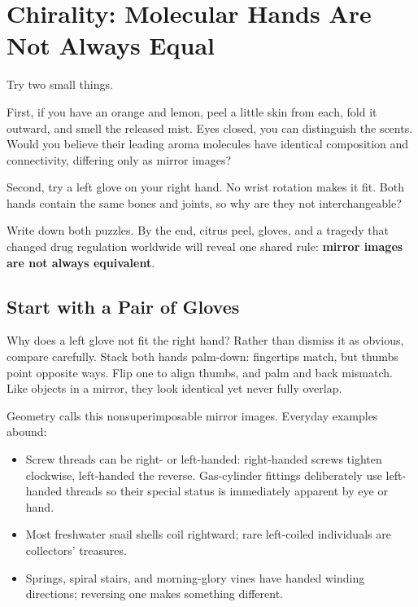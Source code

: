 \chapter{Chirality: Molecular Hands Are Not Always Equal}

\begin{kaichang}
Try two small things.

First, if you have an orange and lemon, peel a little skin from each, fold it outward, and smell the released mist. Eyes closed, you can distinguish the scents. Would you believe their leading aroma molecules have identical composition and connectivity, differing only as mirror images?

Second, try a left glove on your right hand. No wrist rotation makes it fit. Both hands contain the same bones and joints, so why are they not interchangeable?

Write down both puzzles. By the end, citrus peel, gloves, and a tragedy that changed drug regulation worldwide will reveal one shared rule: \textbf{mirror images are not always equivalent}.
\end{kaichang}

\section{Start with a Pair of Gloves}

Why does a left glove not fit the right hand? Rather than dismiss it as obvious, compare carefully. Stack both hands palm-down: fingertips match, but thumbs point opposite ways. Flip one to align thumbs, and palm and back mismatch. Like objects in a mirror, they look identical yet never fully overlap.

Geometry calls this nonsuperimposable mirror images. Everyday examples abound:

\begin{itemize}[itemsep=2pt]
\item Screw threads can be right- or left-handed: right-handed screws tighten clockwise, left-handed the reverse. Gas-cylinder fittings deliberately use left-handed threads so their special status is immediately apparent by eye or hand.
\item Most freshwater snail shells coil rightward; rare left-coiled individuals are collectors' treasures.
\item Springs, spiral stairs, and morning-glory vines have handed winding directions; reversing one makes something different.
\end{itemize}

